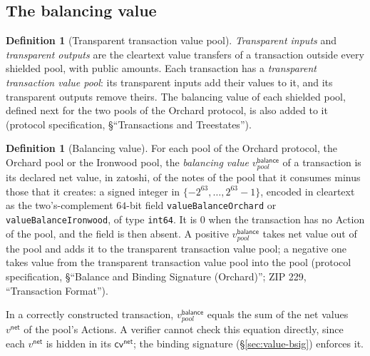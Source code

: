 \documentclass[11pt,a4paper]{article}
\theoremstyle{definition}
\newtheorem{definition}[theorem]{Definition}
\newcommand{\cvsym}{\mathsf{cv}}
\begin{document}
\subsection{The balancing value}\label{sec:value-balance}

\begin{definition}[Transparent transaction value pool]
\emph{Transparent inputs} and \emph{transparent outputs} are the cleartext
value transfers of a transaction outside every shielded pool, with public
amounts. Each transaction has a \emph{transparent transaction value pool}:
its transparent inputs add their values to it, and its transparent outputs
remove theirs. The balancing value of each shielded pool, defined next for
the two pools of the Orchard protocol, is also added to it (protocol
specification, \S``Transactions and Treestates'').
\end{definition}

\begin{definition}[Balancing value]
For each pool of the Orchard protocol, the Orchard pool or the Ironwood pool,
the \emph{balancing value} $v^{\mathsf{balance}}_{\mathit{pool}}$ of a
transaction is its declared net value, in zatoshi, of the notes of the pool
that it consumes minus those that it creates: a signed integer in
$\{-2^{63}, \dots, 2^{63} - 1\}$, encoded in cleartext as the
two's-complement $64$-bit field \texttt{valueBalanceOrchard} or
\texttt{valueBalanceIronwood}, of type \texttt{int64}. It is $0$ when the
transaction has no Action of the pool, and the field is then absent. A
positive $v^{\mathsf{balance}}_{\mathit{pool}}$ takes net value out of the
pool and adds it to the transparent transaction value pool; a negative one
takes value from the transparent transaction value pool into the pool
(protocol specification, \S``Balance and Binding Signature (Orchard)'';
ZIP 229, ``Transaction Format'').
\end{definition}

In a correctly constructed transaction, $v^{\mathsf{balance}}_{\mathit{pool}}$
equals the sum of the net values $v^{\mathsf{net}}$ of the pool's Actions.
A verifier cannot check this equation directly, since each
$v^{\mathsf{net}}$ is hidden in its $\cvsym^{\mathsf{net}}$; the binding
signature (\S\ref{sec:value-bsig}) enforces it.
\end{document}
